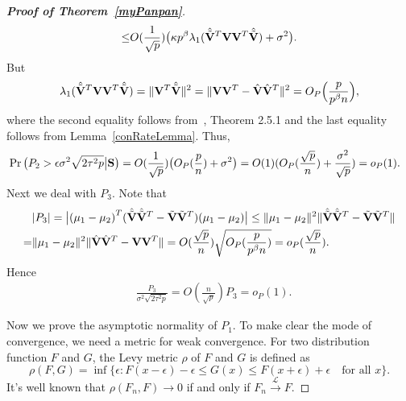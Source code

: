 \documentclass[review]{elsarticle}
\theoremstyle{plain}
\theoremstyle{definition}
\theoremstyle{remark}
\begin{document}
\begin{appendices}
\begin{proof}[\textbf{Proof of Theorem~\ref{myPanpan}}]
\begin{equation*}
\begin{aligned}
             \leq &
             O(\frac{1}{\sqrt{p}})
             \big(\kappa p^{\beta}\lambda_1(\hat{\tilde{\mathbf{V}}}^T \mathbf{V}\mathbf{V}^T  \hat{\tilde{\mathbf{V}}})+\sigma^2\big).\\
        \end{aligned}
    \end{equation*}
    But
    \begin{equation*}
        \begin{aligned}
\lambda_1(\hat{\tilde{\mathbf{V}}}^T \mathbf{V}\mathbf{V}^T  \hat{\tilde{\mathbf{V}}})
=\|\mathbf{V}^T  \hat{\tilde{\mathbf{V}}}\|^2
            = \|\mathbf{V}\mathbf{V}^T-\hat{\mathbf{V}}\hat{\mathbf{V}}^T\|^2=O_P\Big(\frac{p}{p^{\beta}n}\Big),
        \end{aligned}
    \end{equation*}
    where the second equality follows from~\cite{matrixComputations}, Theorem 2.5.1 and the last equality follows from Lemma~\ref{conRateLemma}. 
    Thus,
    \begin{equation*}
        \begin{aligned}
            &\Pr\big({P_2}>\epsilon{\sigma^2\sqrt{2\tau^2 p}}\big|\mathbf{S}\big)
             =
             O(\frac{1}{\sqrt{p}})
             \big(O_P(\frac{p}{n})+\sigma^2\big)
             =O(1)(O_P(\frac{\sqrt{p}}{n})+\frac{\sigma^2}{\sqrt{p}})
             =o_P(1).
        \end{aligned}
    \end{equation*}
    Next we deal with $P_3$.
    Note that
    \begin{equation*}
        \begin{aligned}
            &|P_3|=
            \big|{(\mu_1-\mu_2)}^T(\hat{\tilde{\mathbf{V}}}\hat{\tilde{\mathbf{V}}}^T-\tilde{\mathbf{V}}\tilde{\mathbf{V}}^T)(\mu_1-\mu_2)\big|
            \leq 
            \|\mu_1-\mu_2\|^2 \|\hat{\tilde{\mathbf{V}}}\hat{\tilde{\mathbf{V}}}^T-\tilde{\mathbf{V}}\tilde{\mathbf{V}}^T\|\\
            =& 
            \|\mu_1-\mu_2\|^2  \|\hat{\mathbf{V}}\hat{\mathbf{V}}^T-\mathbf{V}\mathbf{V}^T\|
        =O(\frac{\sqrt{p}}{n})\sqrt{O_P(\frac{p}{p^{\beta}n})}=o_P(\frac{\sqrt{p}}{n}).
        \end{aligned}
    \end{equation*}
    Hence
    \begin{equation*}
        \begin{aligned}
            &\frac{P_3}{\sigma^2\sqrt{2\tau^2 p}}= O(\frac{n}{\sqrt{p}})P_3=o_P(1).
        \end{aligned}
    \end{equation*}

    Now we prove the asymptotic normality of $P_1$.
    To make clear the mode of convergence, we need a metric for weak convergence. For two distribution function $F$ and $G$, the Levy metric $\rho$ of $F$ and $G$ is defined as
    $$
   \rho(F,G) =\inf\{\epsilon:F(x-\epsilon)-\epsilon\leq G(x)\leq F(x+\epsilon)+\epsilon\quad \textrm{for all $x$}\}.
    $$
    It's well known that $\rho(F_n,F)\to 0$ if and only if $F_n\xrightarrow{\mathcal{L}}F$.


\end{proof}
\end{appendices}
\end{document}
